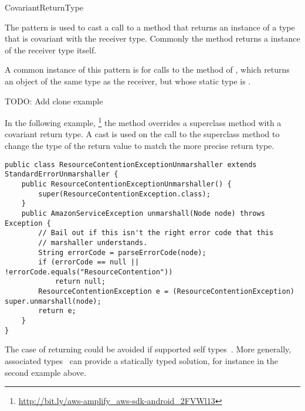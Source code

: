\begin{pattern}{CovariantReturnType}

The \thisp{} pattern is used to cast a call to a method that returns
an instance of a type that is covariant with the 
receiver type.
Commonly the method returns a instance of the receiver type itself.

\instances{}
A common instance of this pattern is for calls to the 
 method of , which returns an object of the same type as the
receiver, but whose static type is .

TODO: Add clone example 

In the following example,%
\footnote{\url{http://bit.ly/aws-amplify_aws-sdk-android_2FVWl13}}
the  method overrides a superclass method with a covariant return type.
A cast is used on the call to the superclass method 
to change the type of the return value to match the more precise return type.

\begin{verbatim}
public class ResourceContentionExceptionUnmarshaller extends StandardErrorUnmarshaller {
    public ResourceContentionExceptionUnmarshaller() {
        super(ResourceContentionException.class);
    }
    public AmazonServiceException unmarshall(Node node) throws Exception {
        // Bail out if this isn't the right error code that this
        // marshaller understands.
        String errorCode = parseErrorCode(node);
        if (errorCode == null || !errorCode.equals("ResourceContention"))
            return null;
        ResourceContentionException e = (ResourceContentionException) super.unmarshall(node);
        return e;
    }
}
\end{verbatim}

\discussion{}
  The case of returning  
                 could be avoided if \java{} supported self types~\cite{bruceChallengingTypingIssues2003}.
  More generally, associated types~\cite{chakravartyAssociatedTypeSynonyms2005}
  can provide a statically typed solution, for instance in the second example
  above.

\end{pattern}


